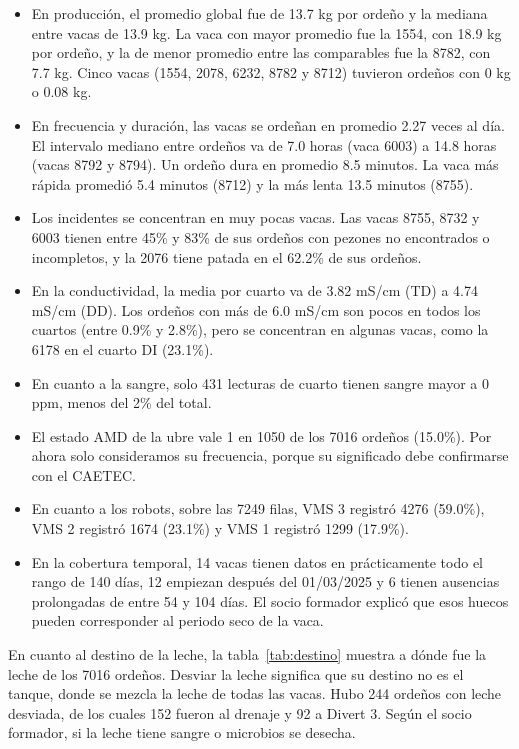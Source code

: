 \begin{itemize}
  \item En producción, el promedio global fue de 13.7 kg por ordeño y la mediana entre vacas de 13.9 kg. La vaca con mayor promedio fue la 1554, con 18.9 kg por ordeño, y la de menor promedio entre las comparables fue la 8782, con 7.7 kg. Cinco vacas (1554, 2078, 6232, 8782 y 8712) tuvieron ordeños con 0 kg o 0.08 kg.
  \item En frecuencia y duración, las vacas se ordeñan en promedio 2.27 veces al día. El intervalo mediano entre ordeños va de 7.0 horas (vaca 6003) a 14.8 horas (vacas 8792 y 8794). Un ordeño dura en promedio 8.5 minutos. La vaca más rápida promedió 5.4 minutos (8712) y la más lenta 13.5 minutos (8755).
  \item Los incidentes se concentran en muy pocas vacas. Las vacas 8755, 8732 y 6003 tienen entre 45\% y 83\% de sus ordeños con pezones no encontrados o incompletos, y la 2076 tiene patada en el 62.2\% de sus ordeños.
  \item En la conductividad, la media por cuarto va de 3.82 mS/cm (TD) a 4.74 mS/cm (DD). Los ordeños con más de 6.0 mS/cm son pocos en todos los cuartos (entre 0.9\% y 2.8\%), pero se concentran en algunas vacas, como la 6178 en el cuarto DI (23.1\%).
  \item En cuanto a la sangre, solo 431 lecturas de cuarto tienen sangre mayor a 0 ppm, menos del 2\% del total.
  \item El estado AMD de la ubre vale 1 en 1050 de los 7016 ordeños (15.0\%). Por ahora solo consideramos su frecuencia, porque su significado debe confirmarse con el CAETEC.
  \item En cuanto a los robots, sobre las 7249 filas, VMS 3 registró 4276 (59.0\%), VMS 2 registró 1674 (23.1\%) y VMS 1 registró 1299 (17.9\%).
  \item En la cobertura temporal, 14 vacas tienen datos en prácticamente todo el rango de 140 días, 12 empiezan después del 01/03/2025 y 6 tienen ausencias prolongadas de entre 54 y 104 días. El socio formador explicó que esos huecos pueden corresponder al periodo seco de la vaca.
\end{itemize}

En cuanto al destino de la leche, la tabla~\ref{tab:destino} muestra a dónde fue la leche de los 7016 ordeños. Desviar la leche significa que su destino no es el tanque, donde se mezcla la leche de todas las vacas. Hubo 244 ordeños con leche desviada, de los cuales 152 fueron al drenaje y 92 a Divert 3. Según el socio formador, si la leche tiene sangre o microbios se desecha.

